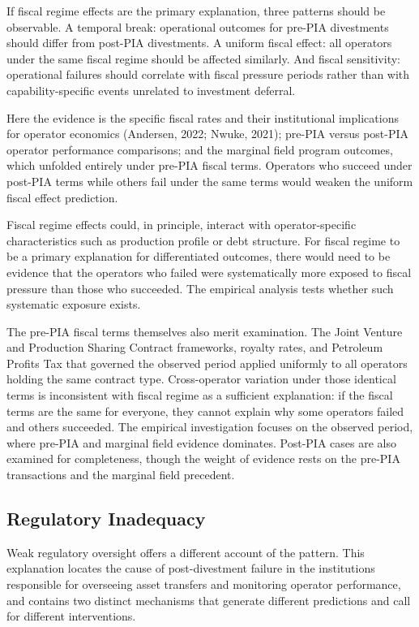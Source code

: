 \documentclass[twoside,fontset=lmodern]{mitthesis}
\begin{document}
If fiscal regime effects are the primary explanation, three patterns
should be observable. A temporal break: operational outcomes for pre-PIA
divestments should differ from post-PIA divestments. A uniform fiscal
effect: all operators under the same fiscal regime should be affected
similarly. And fiscal sensitivity: operational failures should correlate
with fiscal pressure periods rather than with capability-specific events
unrelated to investment deferral.

Here the evidence is the specific fiscal rates and their institutional
implications for operator economics (Andersen, 2022; Nwuke, 2021);
pre-PIA versus post-PIA operator performance comparisons; and the
marginal field program outcomes, which unfolded entirely under pre-PIA
fiscal terms. Operators who succeed under post-PIA terms while others
fail under the same terms would weaken the uniform fiscal effect
prediction.

Fiscal regime effects could, in principle, interact with
operator-specific characteristics such as production profile or debt
structure. For fiscal regime to be a primary explanation for
differentiated outcomes, there would need to be evidence that the
operators who failed were systematically more exposed to fiscal pressure
than those who succeeded. The empirical analysis tests whether such
systematic exposure exists.

The pre-PIA fiscal terms themselves also merit examination. The Joint
Venture and Production Sharing Contract frameworks, royalty rates, and
Petroleum Profits Tax that governed the observed period applied
uniformly to all operators holding the same contract type.
Cross-operator variation under those identical terms is inconsistent
with fiscal regime as a sufficient explanation: if the fiscal terms are
the same for everyone, they cannot explain why some operators failed and
others succeeded. The empirical investigation focuses on the observed
period, where pre-PIA and marginal field evidence dominates. Post-PIA
cases are also examined for completeness, though the weight of evidence
rests on the pre-PIA transactions and the marginal field precedent.

\hypertarget{regulatory-inadequacy}{%
\subsection{Regulatory Inadequacy}\label{regulatory-inadequacy}}

Weak regulatory oversight offers a different account of the pattern.
This explanation locates the cause of post-divestment failure in the
institutions responsible for overseeing asset transfers and monitoring
operator performance, and contains two distinct mechanisms that generate
different predictions and call for different interventions.
\end{document}
